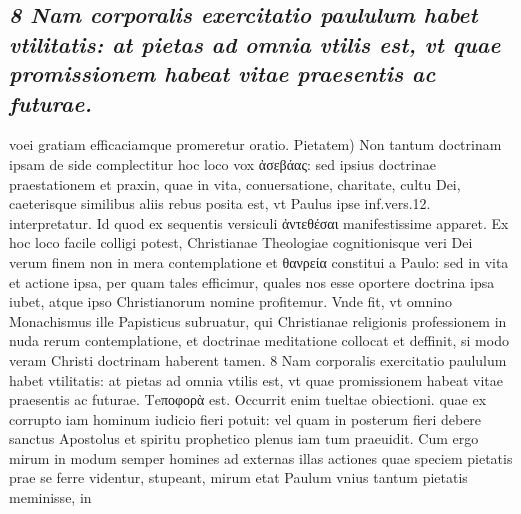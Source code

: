 \documentclass{article}
\begin{document}
\begin{pages}
\subsection*{\textit{8 Nam corporalis exercitatio paululum habet vtilitatis: at pietas ad omnia vtilis est, vt quae promissionem habeat vitae praesentis ac futurae.}}voei gratiam efficaciamque promeretur oratio. Pietatem) Non tantum doctrinam ipsam de side complectitur hoc loco vox ἀσεβάας: sed ipsius doctrinae praestationem et praxin, quae in vita, conuersatione, charitate, cultu Dei, caeterisque similibus aliis rebus posita est, vt Paulus ipse inf.vers.12. interpretatur. Id quod ex sequentis versiculi ἀντεθέσαι manifestissime apparet. Ex hoc loco facile colligi potest, Christianae Theologiae cognitionisque veri Dei verum finem non in mera contemplatione et θανρεία constitui a Paulo: sed in vita et actione ipsa, per quam tales efficimur, quales nos esse oportere doctrina ipsa iubet, atque ipso Christianorum nomine profitemur. Vnde fit, vt omnino Monachismus ille Papisticus subruatur, qui Christianae religionis professionem in nuda rerum contemplatione, et doctrinae meditatione collocat et deffinit, si modo veram Christi doctrinam haberent tamen. 8 Nam corporalis exercitatio paululum habet vtilitatis: at pietas ad omnia vtilis est, vt quae promissionem habeat vitae praesentis ac futurae. Τeποφορὰ est. Occurrit enim tueltae obiectioni. quae ex corrupto iam hominum iudicio fieri potuit: vel quam in posterum fieri debere sanctus Apostolus et spiritu prophetico plenus iam tum praeuidit. Cum ergo mirum in modum semper homines ad externas illas actiones quae speciem pietatis prae se ferre videntur, stupeant, mirum etat Paulum vnius tantum pietatis meminisse, in  \pend

\end{pages}
\end{document}
